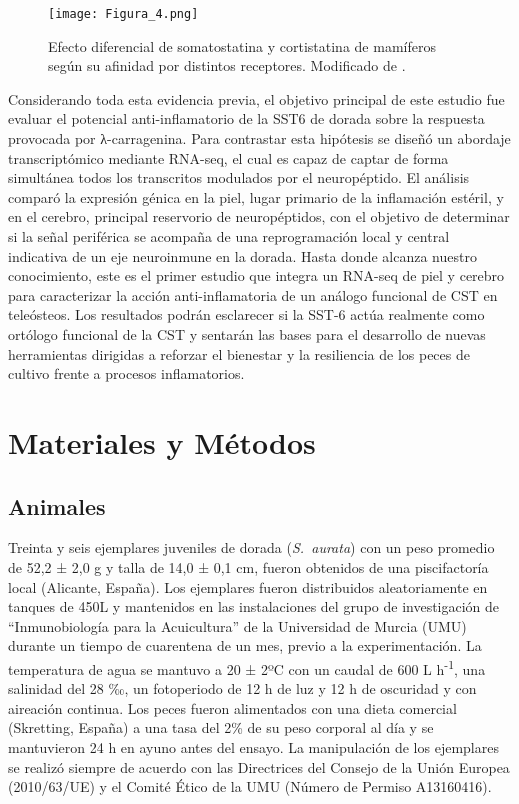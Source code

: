 \documentclass[10pt,a4paper]{article}
\begin{document}
\begin{figure}[ht]
  \centering
 \texttt{[image: Figura\_4.png]}
 
  \caption{Efecto diferencial de somatostatina y cortistatina de mamíferos según su afinidad por distintos receptores. Modificado de \parencite{GonzalezRey2008}.}
  \label{fig:4}
\end{figure}

Considerando toda esta evidencia previa, el objetivo principal de este estudio fue evaluar el potencial anti-inflamatorio de la SST6 de dorada sobre la respuesta provocada por λ-carragenina. Para contrastar esta hipótesis se diseñó un abordaje transcriptómico mediante RNA-seq, el cual es capaz de captar de forma simultánea todos los transcritos modulados por el neuropéptido. El análisis comparó la expresión génica en la piel, lugar primario de la inflamación estéril, y en el cerebro, principal reservorio de neuropéptidos, con el objetivo de determinar si la señal periférica se acompaña de una reprogramación local y central indicativa de un eje neuroinmune en la dorada. Hasta donde alcanza nuestro conocimiento, este es el primer estudio que integra un RNA-seq de piel y cerebro para caracterizar la acción anti-inflamatoria de un análogo funcional de CST en teleósteos. Los resultados podrán esclarecer si la SST-6 actúa realmente como ortólogo funcional de la CST y sentarán las bases para el desarrollo de nuevas herramientas dirigidas a reforzar el bienestar y la resiliencia de los peces de cultivo frente a procesos inflamatorios.

\section{Materiales y Métodos}
\subsection{Animales }
Treinta y seis ejemplares juveniles de dorada (\textit{S.\ aurata}) con un peso promedio de 52,2 ± 2,0 g y talla de 14,0 ± 0,1 cm, fueron obtenidos de una piscifactoría local (Alicante, España). Los ejemplares fueron distribuidos aleatoriamente en tanques de 450L y mantenidos en las instalaciones del grupo de investigación de “Inmunobiología para la Acuicultura” de la Universidad de Murcia (UMU) durante un tiempo de cuarentena de un mes, previo a la experimentación. La temperatura de agua se mantuvo a 20 ± 2ºC con un caudal de 600 L h\textsuperscript{-1}, una salinidad del 28 ‰, un fotoperiodo de 12 h de luz y 12 h de oscuridad y con aireación continua. Los peces fueron alimentados con una dieta comercial (Skretting, España) a una tasa del 2\% de su peso corporal al día y se mantuvieron 24 h en ayuno antes del ensayo. La manipulación de los ejemplares se realizó siempre de acuerdo con las Directrices del Consejo de la Unión Europea (2010/63/UE) y el Comité Ético de la UMU (Número de Permiso A13160416).
\end{document}
